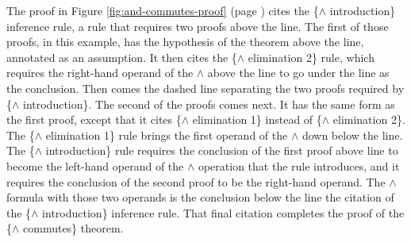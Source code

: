 The proof in
Figure \ref{fig:and-commutes-proof} (page \pageref{fig:and-commutes-proof})
cites the \{$\wedge$ introduction\} inference rule,
a rule that requires two proofs above the line.
The first of those proofs, in this example, has the hypothesis
of the theorem above the line, annotated as an assumption.
It then cites the \{$\wedge$ elimination 2\} rule,
which requires the right-hand operand of the $\wedge$
above the line to go under the line as the conclusion.
Then comes the dashed line separating
the two proofs required by \{$\wedge$ introduction\}.
The second of the proofs comes next.
It has the same form as the first proof,
except that it cites \{$\wedge$ elimination 1\} instead of \{$\wedge$ elimination 2\}.
The \{$\wedge$ elimination 1\} rule brings the first operand of the $\wedge$
down below the line.
The \{$\wedge$ introduction\} rule requires the
conclusion of the first proof above line to
become the left-hand operand of the $\wedge$
operation that the rule introduces,
and it requires the conclusion of the second
proof to be the right-hand operand.
The $\wedge$ formula with those two operands
is the conclusion below the line the citation of the \{$\wedge$ introduction\} inference rule.
That final citation completes the proof of the \{$\wedge$ commutes\} theorem.

